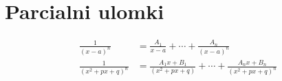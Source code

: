 \documentclass[a4paper,12pt]{article}
\begin{document}
\tableofcontents

\section{Parcialni ulomki}


\begin{align*}
    \frac{1}{(x-a)^n} &= \frac{A_1}{x-a} + \cdots + \frac{A_n}{(x-a)^n} \\
    \frac{1}{(x^2 + px + q)^n} &= \frac{A_1x + B_1}{(x^2 + px + q)} + \cdots + \frac{A_nx + B_n}{(x^2 + px + q)^n}
\end{align*}
\end{document}
